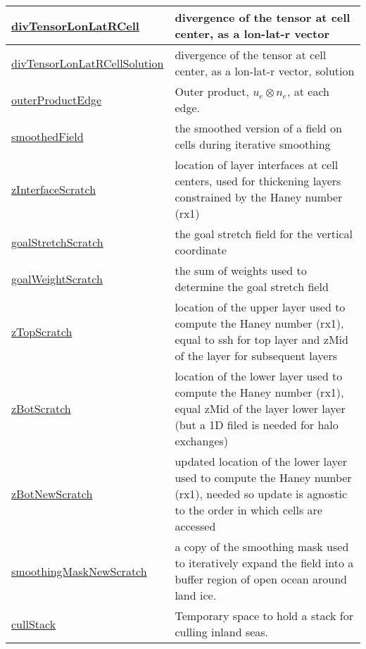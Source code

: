 {\begin{center}
\begin{longtable}{| p{2.0in} | p{4.0in} |}
    \hline
    \hyperref[subsec:var_sec_scratch_divTensorLonLatRCell]{divTensorLonLatRCell} & divergence of the tensor at cell center, as a lon-lat-r vector \\
    \hline
    \hyperref[subsec:var_sec_scratch_divTensorLonLatRCellSolution]{divTensorLonLatRCellSolution} & divergence of the tensor at cell center, as a lon-lat-r vector, solution \\
    \hline
    \hyperref[subsec:var_sec_scratch_outerProductEdge]{outerProductEdge} & Outer product, $u_e \otimes n_e$, at each edge. \\
    \hline
    \hyperref[subsec:var_sec_scratch_smoothedField]{smoothedField} & the smoothed version of a field on cells during iterative smoothing \\
    \hline
    \hyperref[subsec:var_sec_scratch_zInterfaceScratch]{zInterfaceScratch} & location of layer interfaces at cell centers, used for thickening layers constrained by the Haney number (rx1) \\
    \hline
    \hyperref[subsec:var_sec_scratch_goalStretchScratch]{goalStretchScratch} & the goal stretch field for the vertical coordinate \\
    \hline
    \hyperref[subsec:var_sec_scratch_goalWeightScratch]{goalWeightScratch} & the sum of weights used to determine the goal stretch field \\
    \hline
    \hyperref[subsec:var_sec_scratch_zTopScratch]{zTopScratch} & location of the upper layer used to compute the Haney number (rx1), equal to ssh for top layer and zMid of the layer for subsequent layers \\
    \hline
    \hyperref[subsec:var_sec_scratch_zBotScratch]{zBotScratch} & location of the lower layer used to compute the Haney number (rx1), equal zMid of the layer lower layer (but a 1D filed is needed for halo exchanges) \\
    \hline
    \hyperref[subsec:var_sec_scratch_zBotNewScratch]{zBotNewScratch} & updated location of the lower layer used to compute the Haney number (rx1), needed so update is agnostic to the order in which cells are accessed \\
    \hline
    \hyperref[subsec:var_sec_scratch_smoothingMaskNewScratch]{smoothingMaskNewScratch} & a copy of the smoothing mask used to iteratively expand the field into a buffer region of open ocean around land ice. \\
    \hline
    \hyperref[subsec:var_sec_scratch_cullStack]{cullStack} & Temporary space to hold a stack for culling inland seas. \\

\end{longtable}
\end{center}}
